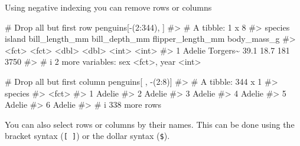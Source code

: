 \documentclass[
  letterpaper,
  DIV=11,
  numbers=noendperiod]{scrreprt}
\newenvironment{Shaded}{\begin{snugshade}}{\end{snugshade}}
\newcommand{\CommentTok}[1]{\textcolor[rgb]{0.37,0.37,0.37}{#1}}
\newcommand{\DecValTok}[1]{\textcolor[rgb]{0.68,0.00,0.00}{#1}}
\newcommand{\NormalTok}[1]{\textcolor[rgb]{0.00,0.23,0.31}{#1}}
\newcommand{\SpecialCharTok}[1]{\textcolor[rgb]{0.37,0.37,0.37}{#1}}
\begin{document}
Using negative indexing you can remove rows or columns

\begin{Shaded}
\begin{Highlighting}[]
\CommentTok{\# Drop all but first row}
\NormalTok{penguins[}\SpecialCharTok{{-}}\NormalTok{(}\DecValTok{2}\SpecialCharTok{:}\DecValTok{344}\NormalTok{), ]}
\CommentTok{\#\textgreater{} \# A tibble: 1 x 8}
\CommentTok{\#\textgreater{}   species island   bill\_length\_mm bill\_depth\_mm flipper\_length\_mm body\_mass\_g}
\CommentTok{\#\textgreater{}   \textless{}fct\textgreater{}   \textless{}fct\textgreater{}             \textless{}dbl\textgreater{}         \textless{}dbl\textgreater{}             \textless{}int\textgreater{}       \textless{}int\textgreater{}}
\CommentTok{\#\textgreater{} 1 Adelie  Torgers\textasciitilde{}           39.1          18.7               181        3750}
\CommentTok{\#\textgreater{} \# i 2 more variables: sex \textless{}fct\textgreater{}, year \textless{}int\textgreater{}}
\end{Highlighting}
\end{Shaded}

\begin{Shaded}
\begin{Highlighting}[]
\CommentTok{\# Drop all but first column }
\NormalTok{penguins[ , }\SpecialCharTok{{-}}\NormalTok{(}\DecValTok{2}\SpecialCharTok{:}\DecValTok{8}\NormalTok{)]}
\CommentTok{\#\textgreater{} \# A tibble: 344 x 1}
\CommentTok{\#\textgreater{}   species}
\CommentTok{\#\textgreater{}   \textless{}fct\textgreater{}  }
\CommentTok{\#\textgreater{} 1 Adelie }
\CommentTok{\#\textgreater{} 2 Adelie }
\CommentTok{\#\textgreater{} 3 Adelie }
\CommentTok{\#\textgreater{} 4 Adelie }
\CommentTok{\#\textgreater{} 5 Adelie }
\CommentTok{\#\textgreater{} 6 Adelie }
\CommentTok{\#\textgreater{} \# i 338 more rows}
\end{Highlighting}
\end{Shaded}

You can also select rows or columns by their names. This can be done
using the bracket syntax (\texttt{{[}\ {]}}) or the dollar syntax
(\texttt{\$}).
\end{document}
